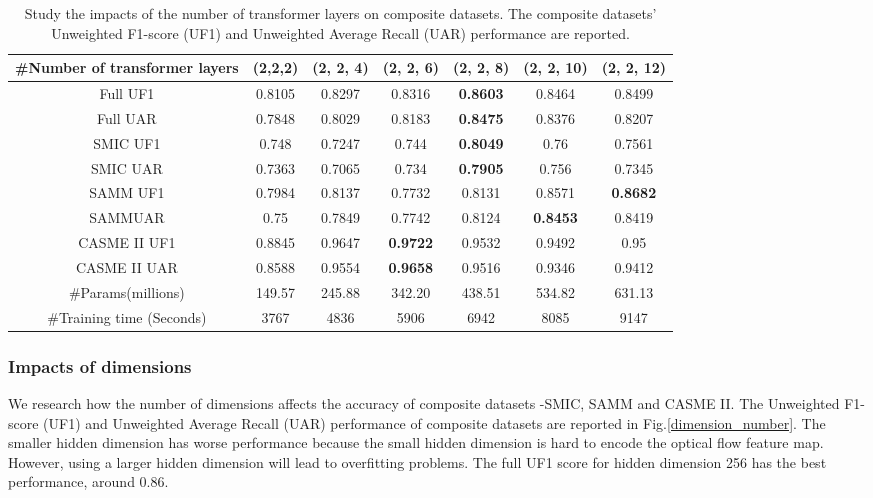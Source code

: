 \documentclass[review,12pt, 3p]{elsarticle}
\begin{document}
 \begin{table*}[t]
\centering
\small
\caption{ Study the impacts of the number of transformer layers on composite datasets. The composite datasets' Unweighted F1-score (UF1) and Unweighted Average Recall (UAR) performance are reported.}
\begin{tabular}{c| c c c c c c    }
\hline
\#Number of transformer layers & (2,2,2) & (2, 2, 4)& (2, 2, 6)& (2, 2, 8)& (2, 2, 10)& (2, 2, 12)\\
\hline
Full UF1   &0.8105 &0.8297  & 0.8316   & \textbf{0.8603} & 0.8464 & 0.8499\\
Full UAR  &0.7848 &0.8029  & 0.8183  & \textbf{0.8475}   & 0.8376 & 0.8207 \\
SMIC UF1   &0.748 &0.7247  & 0.744   & \textbf{0.8049} & 0.76 & 0.7561\\
SMIC UAR  &0.7363 &0.7065  & 0.734  & \textbf{0.7905}   & 0.756 & 0.7345 \\
SAMM UF1   &0.7984 &0.8137  & 0.7732   & 0.8131 & 0.8571 & \textbf{0.8682}\\
SAMMUAR  &0.75 &0.7849  & 0.7742  & 0.8124   & \textbf{0.8453} & 0.8419 \\
CASME II UF1   &0.8845 &0.9647  & \textbf{0.9722}   & 0.9532 & 0.9492 & 0.95\\
CASME II UAR  &0.8588 &0.9554  & \textbf{0.9658}  & 0.9516   & 0.9346 & 0.9412 \\
\hline
\#Params(millions)  &149.57  & 245.88  & 342.20 & 438.51 & 534.82 & 631.13  \\
\#Training time (Seconds)  &3767  & 4836  &  5906 & 6942 & 8085 & 9147\\
\hline
\end{tabular}
 \label{number-of-transformer-layers}
\end{table*}

\subsubsection{Impacts of dimensions}
We research how the number of dimensions affects the accuracy of composite datasets -SMIC, SAMM and CASME II. The Unweighted F1-score (UF1) and Unweighted Average Recall (UAR) performance of composite datasets are reported in Fig.\ref{dimension_number}. The smaller hidden dimension has worse performance because the small hidden dimension is hard to encode the optical flow feature map. However, using a larger hidden dimension will lead to overfitting problems. The full UF1 score for hidden dimension 256 has the best performance, around 0.86. 
\end{document}
